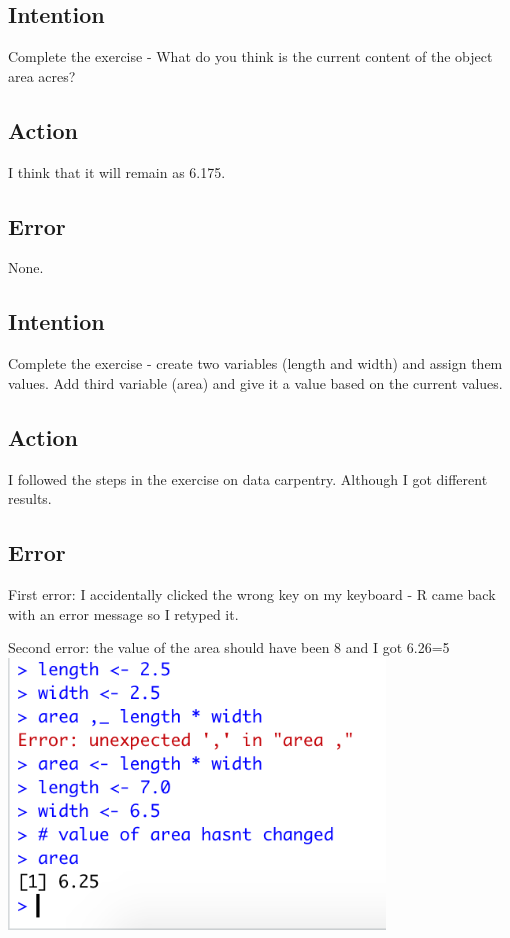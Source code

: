 \documentclass{article}
\begin{document}
\subsection{Intention}
Complete the exercise - What do you think is the current content of the object area acres? 

\subsection{Action}
I think that it will remain as 6.175.

\subsection{Error}
None.

\subsection{Intention}
Complete the exercise - create two variables (length and width) and assign them values. Add third variable (area) and give it a value based on the current values.

\subsection{Action}
I followed the steps in the exercise on data carpentry. Although I got different results.

\subsection{Error}
First error: I accidentally clicked the wrong key on my keyboard - R came back with an error message so I retyped it.

Second error: the value of the area should have been 8 and I got 6.26=5
\includegraphics[width=10cm]{length_width.png}
\end{document}
